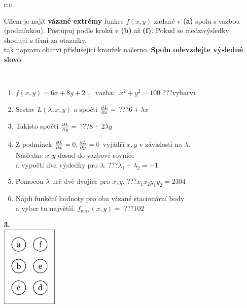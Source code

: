 \documentclass[10pt]{report}
\begin{document}
\begin{tabular}{c:c}
\begin{minipage}[c][104.5mm][t]{0.5\linewidth}
\begin{center}
\begin{minipage}{0.95\linewidth}
\begin{center}
Cílem je najít \textbf{vázané extrémy} funkce $f(x,y)$ zadané v \textbf{(a)} spolu s vazbou (podmínkou). Postupuj podle krokú v \textbf{(b)} až \textbf{(f)}. Pokud se medzivýsledky shodujú s těmi za otazníky,\\tak napravo obarvi příslušející kroužek načerno. \textbf{Spolu odevzdejte výsledné slovo}.
\end{center}
\end{minipage}
\\[1mm]
\begin{minipage}{0.79\linewidth}
\begin{center}
\begin{varwidth}{\linewidth}
\begin{enumerate}
\normalsize
\item $f(x,y)=6x+8y+2 \enspace , \enspace \mathrm{vazba:} \enspace x^2+y^2=100$\quad \dotfill\; ???\;\dotfill \quad vybarvi
\item Sestav $L(\lambda,x,y)$ a spočti $\pdv{L}{x}=$\quad \dotfill\; ???\;\dotfill \quad $6+\lambda x$
\item Takisto spočti $\pdv{L}{y}=$\quad \dotfill\; ???\;\dotfill \quad $8+2\lambda y$
\item Z podmínek $\pdv{L}{x}=0 , \pdv{L}{y}=0$ vyjádři $x,y$ v závislosti na $\lambda$.\\ \phantom{xxxxxx}Následne $x,y$ dosaď do vazbové rovnice\\ \phantom{xxxxxx}a vypočti dva výsledky pro $\lambda$.\quad \dotfill\; ???\;\dotfill \quad $\lambda_1+\lambda_2=-1$
\item Pomocou $\lambda$ urč dvě dvojice pro $x,y$.\quad \dotfill\; ???\;\dotfill \quad $x_1 x_2 y_1 y_2=2304$
\item Najdi funkční hodnoty pro oba vázané stacionární body\\ \phantom{xxxxxx}a vyber tu najvětší. $f_{\text{max}}(x,y)=$\quad \dotfill\; ???\;\dotfill \quad $102$
\end{enumerate}
\end{varwidth}
\end{center}
\end{minipage}
\begin{minipage}{0.20\linewidth}
\begin{center}
{\Huge\bfseries 3.} \\[2mm]
\includegraphics[height=40mm]{../images/braille.png}

\end{center}
\end{minipage}
\end{center}
\end{minipage}
\end{tabular}
\end{document}
